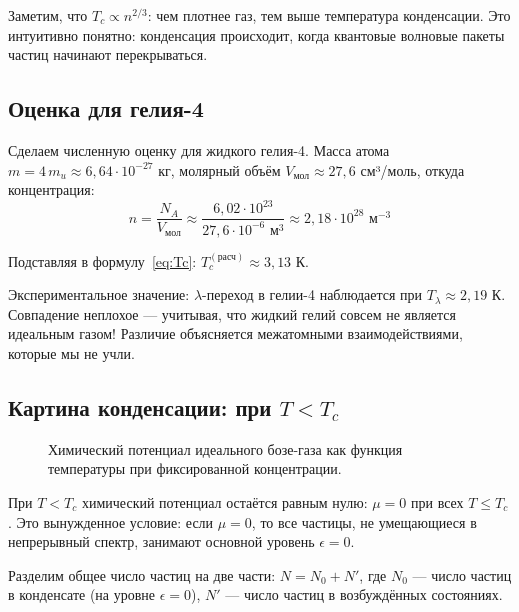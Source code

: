 \documentclass[../general/general]{subfiles}
\begin{document}
Заметим, что $T_c \propto n^{2/3}$: чем плотнее газ, тем выше температура конденсации. Это интуитивно понятно: конденсация происходит, когда квантовые волновые пакеты частиц начинают перекрываться.

\subsection{Оценка для гелия-4}

Сделаем численную оценку для жидкого гелия-4. Масса атома $m = 4\,m_u \approx 6{,}64\cdot10^{-27}$ кг, молярный объём $V_\text{мол} \approx 27{,}6$ см³/моль, откуда концентрация:
\begin{equation}
    n = \frac{N_A}{V_\text{мол}} \approx \frac{6{,}02\cdot10^{23}}{27{,}6\cdot10^{-6}\text{ м}^3} \approx 2{,}18\cdot10^{28}\text{ м}^{-3}
\end{equation}

Подставляя в формулу~\eqref{eq:Tc}: $T_c^{(\text{расч})} \approx 3{,}13$ К.

Экспериментальное значение: $\lambda$-переход в гелии-4 наблюдается при $T_\lambda \approx 2{,}19$ К. Совпадение неплохое --- учитывая, что жидкий гелий совсем не является идеальным газом! Различие объясняется межатомными взаимодействиями, которые мы не учли.

\subsection{Картина конденсации: при $T < T_c$}

\begin{figure}[h!]
    \centering
    \caption{Химический потенциал идеального бозе-газа как функция температуры при фиксированной концентрации.}
\end{figure}

При $T < T_c$ химический потенциал остаётся равным нулю: $\mu = 0$ при всех $T \leq T_c$. Это вынужденное условие: если $\mu = 0$, то все частицы, не умещающиеся в непрерывный спектр, занимают основной уровень $\epsilon = 0$.

Разделим общее число частиц на две части: $N = N_0 + N'$, где $N_0$ --- число частиц в конденсате (на уровне $\epsilon = 0$), $N'$ --- число частиц в возбуждённых состояниях.
\end{document}
